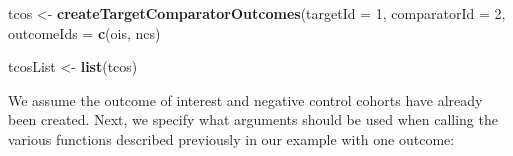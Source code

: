 \documentclass[11pt]{book}
\newenvironment{Shaded}{\begin{snugshade}}{\end{snugshade}}
\newcommand{\KeywordTok}[1]{\textcolor[rgb]{0.13,0.29,0.53}{\textbf{#1}}}
\newcommand{\DataTypeTok}[1]{\textcolor[rgb]{0.13,0.29,0.53}{#1}}
\newcommand{\DecValTok}[1]{\textcolor[rgb]{0.00,0.00,0.81}{#1}}
\newcommand{\StringTok}[1]{\textcolor[rgb]{0.31,0.60,0.02}{#1}}
\newcommand{\NormalTok}[1]{#1}
\begin{document}
\begin{Shaded}
\begin{Highlighting}[]
\NormalTok{tcos <-}\StringTok{ }\KeywordTok{createTargetComparatorOutcomes}\NormalTok{(}\DataTypeTok{targetId =} \DecValTok{1}\NormalTok{,}
                                       \DataTypeTok{comparatorId =} \DecValTok{2}\NormalTok{,}
                                       \DataTypeTok{outcomeIds =} \KeywordTok{c}\NormalTok{(ois, ncs)}

\NormalTok{tcosList <-}\StringTok{ }\KeywordTok{list}\NormalTok{(tcos)}
\end{Highlighting}
\end{Shaded}

We assume the outcome of interest and negative control cohorts have
already been created. Next, we specify what arguments should be used
when calling the various functions described previously in our example
with one outcome:
\end{document}
